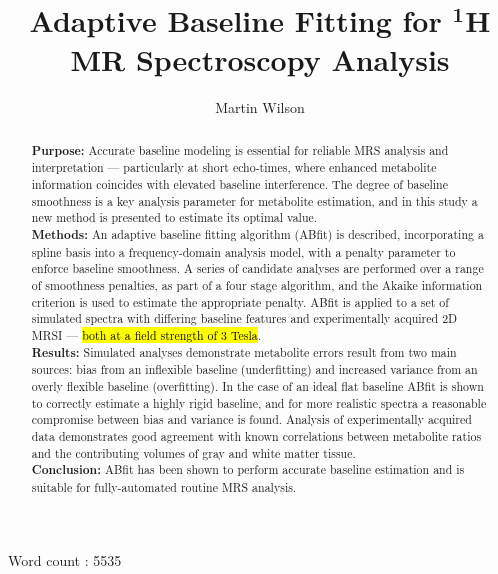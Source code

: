 \documentclass[num-refs]{wiley-article}
\title{Adaptive Baseline Fitting for $^{\textbf{1}}$H MR Spectroscopy Analysis}
\author[1]{Martin Wilson}
\affil[1]{Centre for Human Brain Health and School of Psychology, University of Birmingham, Birmingham, UK.}
\newcommand{\revone}[2]{\hl{#1}\marginnote{\hl{#2}}}
\begin{document}
\maketitle

\begin{abstract}
  \textbf{Purpose:} Accurate baseline modeling is essential for reliable MRS analysis and interpretation --- particularly at short echo-times, where enhanced metabolite information coincides with elevated baseline interference. The degree of baseline smoothness is a key analysis parameter for metabolite estimation, and in this study a new method is presented to estimate its optimal value. \\
    \textbf{Methods:} An adaptive baseline fitting algorithm (ABfit) is described, incorporating a spline basis into a frequency-domain analysis model, with a penalty parameter to enforce baseline smoothness. A series of candidate analyses are performed over a range of smoothness penalties, as part of a four stage algorithm, and the Akaike information criterion is used to estimate the appropriate penalty. ABfit is applied to a set of simulated spectra with differing baseline features and experimentally acquired 2D MRSI --- \revone{both at a field strength of 3 Tesla}{R2.5}. \\
  \textbf{Results:} Simulated analyses demonstrate metabolite errors result from two main sources: bias from an inflexible baseline (underfitting) and increased variance from an overly flexible baseline (overfitting). In the case of an ideal flat baseline ABfit is shown to correctly estimate a highly rigid baseline, and for more realistic spectra a reasonable compromise between bias and variance is found. Analysis of experimentally acquired data demonstrates good agreement with known correlations between metabolite ratios and the contributing volumes of gray and white matter tissue. \\
  \textbf{Conclusion:} ABfit has been shown to perform accurate baseline estimation and is suitable for fully-automated routine MRS analysis.
\end{abstract}

Word count : 5535

\end{document}
